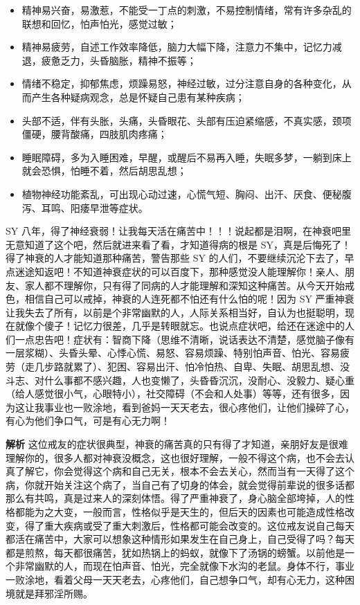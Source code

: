 \begin{itemize}
    \item 精神易兴奋，易激惹，不能受一丁点的刺激，不易控制情绪，常有许多杂乱的联想和回忆，怕声怕光，感觉过敏；
    \item 精神易疲劳，自述工作效率降低，脑力大幅下降，注意力不集中，记忆力减退，疲惫乏力，头昏脑胀，精神不振等；
    \item 情绪不稳定，抑郁焦虑，烦躁易怒，神经过敏，过分注意自身的各种变化，从而产生各种疑病观念，总是怀疑自己患有某种疾病；
    \item 头部不适，伴有头胀，头痛，头昏眼花、头部有压迫紧缩感，不真实感，颈项僵硬，腰背酸痛，四肢肌肉疼痛；
    \item 睡眠障碍，多为入睡困难，早醒，或醒后不易再入睡，失眠多梦，一躺到床上就会恐惧，怕睡不着，然后胡思乱想；
    \item 植物神经功能紊乱，可出现心动过速，心慌气短、胸闷、出汗、厌食、便秘腹泻、耳鸣、阳痿早泄等症状。
\end{itemize}

\begin{case}[神经衰弱]
    SY 八年，得了神经衰弱！让我每天活在痛苦中！！！说起都是泪啊，在神衰吧里无意知道了这个吧，然后就进来看了看，才知道得病的根是 SY，真是后悔死了！得了神衰的人才能知道那种痛苦，警告那些 SY 的人们，不要继续沉沦下去了，早点迷途知返吧！不知道神衰症状的可以百度下，那种感觉没人能理解你！亲人、朋友、家人都不理解你，只有得了同病的人才能理解和深知这种痛苦。从今天开始戒色，相信自己可以戒掉，神衰的人连死都不怕还有什么怕的呢！因为 SY 严重神衰让我失去了所有，以前是个非常幽默的人，人际关系相当好，自认为也挺聪明，现在就像个傻子！记忆力很差，几乎是转眼就忘。也说点症状吧，给还在迷途中的人们一点忠告吧！症状有：智商下降（思维不清晰，说话表达不清楚，感觉脑子像有一层浆糊）、头昏头晕、心悸心慌、易怒、容易烦躁、特别怕声音、怕光、容易疲劳（走几步路就累了）、犯困、容易出汗、怕冷怕热、自卑、失眠、胡思乱想、没斗志、对什么事都不感兴趣，人也变懒了，头昏昏沉沉，没耐心、没毅力、疑心重（给人感觉很小气，心眼特小），社交障碍（不会和人处事）等等，还有很多，因为这让我事业也一败涂地，看到爸妈一天天老去，很心疼他们，让他们操碎了心，有心为他们争口气，可是有心无力啊！

    \textbf{解析} 这位戒友的症状很典型，神衰的痛苦真的只有得了才知道，亲朋好友是很难理解你的，很多人都对神衰没概念，这也很好理解，一般不得这个病，也不会去认真了解它，你会觉得这个病和自己无关，根本不会去关心，然而当有一天得了这个病，你就开始关注这个病了，当自己有了切身的体会，就会觉得前辈说的很多话都那么有共鸣，真是过来人的深刻体悟。得了严重神衰了，身心脑全部垮掉，人的性格都能为之大变，一般而言，性格似乎是天生的，但后天的因素也可能造成性格改变，得了重大疾病或受了重大刺激后，性格都可能会改变的。这位戒友说自己每天都活在痛苦中，大家可以想象这种情形如果发生在自己身上，自己受得了吗？每天都是煎熬，每天都很痛苦，犹如热锅上的蚂蚁，就像下了汤锅的螃蟹。以前他是一个非常幽默的人，而现在怕声音、怕光，完全就像下水沟的老鼠。身体不行，事业一败涂地，看着父母一天天老去，心疼他们，自己想争口气，却有心无力，这种困境就是拜邪淫所赐。
\end{case}

